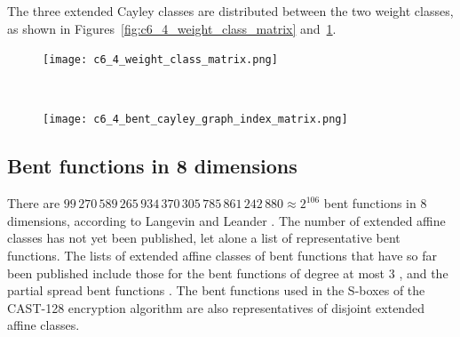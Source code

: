 \documentclass[12pt,a4paper]{article}
\begin{document}

The three extended Cayley classes are distributed between the two weight classes,
as shown in Figures~\ref{fig:c6_4_weight_class_matrix} and~\ref{fig:c6_4_bent_cayley_graph_index_matrix}.

\begin{figure}[!hpt] %
\centering
\begin{minipage}{.48\textwidth}
  \centering
  \texttt{[image: c6\_4\_weight\_class\_matrix.png]}
  \label{fig:c6_4_weight_class_matrix}
\end{minipage}%
~~~~
\begin{minipage}{.48\textwidth}
  \centering
  \texttt{[image: c6\_4\_bent\_cayley\_graph\_index\_matrix.png]}
  \label{fig:c6_4_bent_cayley_graph_index_matrix}
\end{minipage}
\end{figure}
\subsection{Bent functions in 8 dimensions}

There are
$99\,270\,589\,265\,934\,370\,305\,785\,861\,242\,880 \approx 2^{106}$ bent functions in 8 dimensions,
according to Langevin and Leander \cite{LanL11counting}.
%
%
The number of extended affine classes has not yet been published,
let alone a list of representative bent functions.
The lists of extended affine classes of bent functions that have so far been published include those
for the bent functions of degree at most 3 \cite[Section 5.5.2]{Bra06thesis} \cite[Section 7.3]{Tok15bent},
and the partial spread bent functions \cite{Lan10psf,LanH11counting}.
The bent functions used in the S-boxes of the CAST-128 encryption algorithm \cite{Ada97,RFC2144}
are also representatives of disjoint extended affine classes.
\newpage
\end{document}
